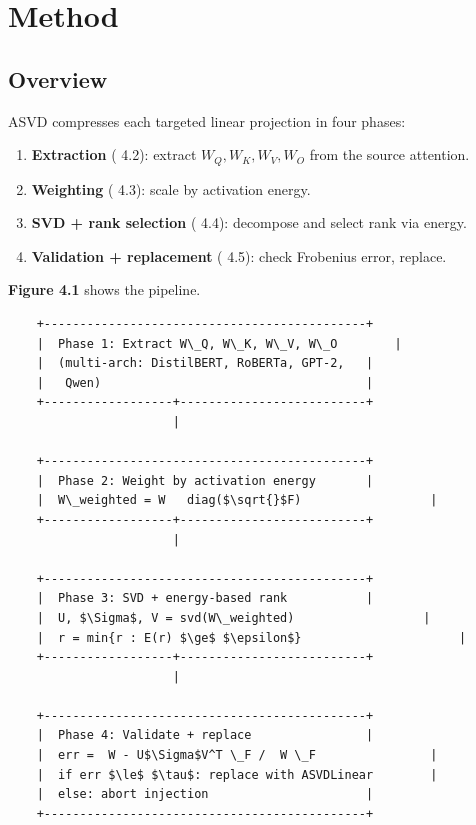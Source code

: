 
\section{Method}

\subsection{Overview}

ASVD compresses each targeted linear projection in four phases:

\begin{enumerate}
\item \textbf{Extraction} ( 4.2): extract $W_Q, W_K, W_V, W_O$ from the source
  attention.
\item \textbf{Weighting} ( 4.3): scale by activation energy.
\item \textbf{SVD + rank selection} ( 4.4): decompose and select rank via energy.
\item \textbf{Validation + replacement} ( 4.5): check Frobenius error, replace.

\end{enumerate}
\textbf{Figure 4.1} shows the pipeline.

\begin{lstlisting}
    +---------------------------------------------+
    |  Phase 1: Extract W\_Q, W\_K, W\_V, W\_O        |
    |  (multi-arch: DistilBERT, RoBERTa, GPT-2,   |
    |   Qwen)                                     |
    +------------------+--------------------------+
                       |
                        
    +---------------------------------------------+
    |  Phase 2: Weight by activation energy       |
    |  W\_weighted = W   diag($\sqrt{}$F)                  |
    +------------------+--------------------------+
                       |
                        
    +---------------------------------------------+
    |  Phase 3: SVD + energy-based rank           |
    |  U, $\Sigma$, V = svd(W\_weighted)                  |
    |  r = min{r : E(r) $\ge$ $\epsilon$}                      |
    +------------------+--------------------------+
                       |
                        
    +---------------------------------------------+
    |  Phase 4: Validate + replace                |
    |  err =  W - U$\Sigma$V^T \_F /  W \_F                |
    |  if err $\le$ $\tau$: replace with ASVDLinear        |
    |  else: abort injection                      |
    +---------------------------------------------+
\end{lstlisting}

